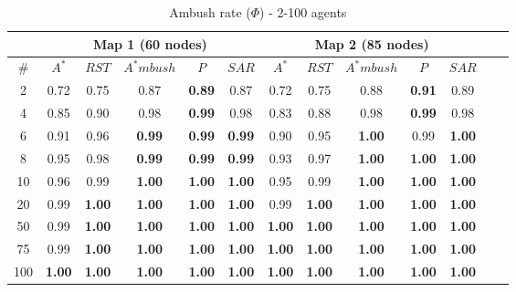 \begin{table}[h]
\caption{Ambush rate ($\Phi$) - 2-100 agents}
\begin{center}

\begin{tabular}{|c|c|c|c|c|c||c|c|c|c|c|c|c|}
\hline
 & 
\multicolumn{5}{|c||}{\textbf{Map 1 (60 nodes)}} &
\multicolumn{5}{|c|}{\textbf{Map 2 (85 nodes)}}\\
\hline
\# & $A^*$ & $RST$ & $A^*mbush$ & $P$ & $SAR$ &
	 $A^*$ & $RST$ & $A^*mbush$ & $P$ & $SAR$\\
\hline
 2 & 0.72 & 0.75 & 0.87 & \textbf{0.89} & 0.87 &
	 0.72 & 0.75 & 0.88 & \textbf{0.91} & 0.89\\
 4 & 0.85 & 0.90 & 0.98 & \textbf{0.99} & 0.98 &
	 0.83 & 0.88 & 0.98 & \textbf{0.99} & 0.98\\
 6 & 0.91 & 0.96 & \textbf{0.99} & \textbf{0.99} & \textbf{0.99} &
	 0.90 & 0.95 & \textbf{1.00} & 0.99 & \textbf{1.00}\\
 8 & 0.95 & 0.98 & \textbf{0.99} & \textbf{0.99} & \textbf{0.99} &
	0.93 & 0.97 & \textbf{1.00} & \textbf{1.00} & \textbf{1.00}\\
10 & 0.96 & 0.99 & \textbf{1.00} & \textbf{1.00} & \textbf{1.00} &
	 0.95 & 0.99 & \textbf{1.00} & \textbf{1.00} & \textbf{1.00}\\
20 & 0.99 & \textbf{1.00} & \textbf{1.00} & \textbf{1.00} & \textbf{1.00} &
     0.99 & \textbf{1.00} & \textbf{1.00} & \textbf{1.00} & \textbf{1.00}\\
50 & 0.99 & \textbf{1.00} & \textbf{1.00} & \textbf{1.00} & \textbf{1.00} &
	\textbf{1.00} & \textbf{1.00} & \textbf{1.00} & \textbf{1.00} & 
	\textbf{1.00}\\
75 & 0.99 & \textbf{1.00} & \textbf{1.00} & \textbf{1.00} & \textbf{1.00} &
	\textbf{1.00} & \textbf{1.00} & \textbf{1.00} & \textbf{1.00} &
	\textbf{1.00}\\
100 & \textbf{1.00} & \textbf{1.00} & \textbf{1.00} & \textbf{1.00} & 
	\textbf{1.00} & 
	\textbf{1.00} & \textbf{1.00} & \textbf{1.00} & \textbf{1.00} & \textbf{1.00}\\
\hline
\end{tabular}

\label{ambushrate}
\end{center}
\end{table}